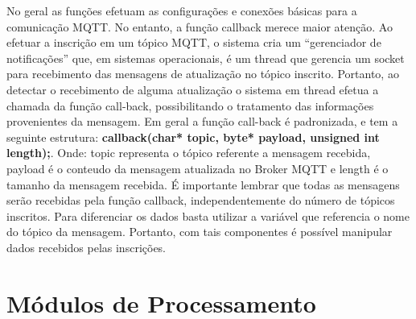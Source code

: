     No geral as funções efetuam as configurações e conexões básicas para a comunicação MQTT. No entanto, a função callback merece maior atenção.
	Ao efetuar a inscrição em um tópico MQTT, o sistema cria um “gerenciador de notificações” que, em sistemas operacionais, é um thread que gerencia um socket para recebimento das mensagens de atualização no tópico inscrito. Portanto, ao detectar o recebimento de alguma atualização o sistema em thread efetua a chamada da função call-back, possibilitando o tratamento das informações provenientes da mensagem.
	Em geral a função call-back é padronizada, e tem a seguinte estrutura: 
    \textbf{callback(char* topic, byte* payload, unsigned int length);}.
    Onde: topic representa o tópico referente a mensagem recebida, payload é o conteudo da mensagem atualizada no Broker MQTT e length é o tamanho da mensagem recebida.
	É importante lembrar que todas as mensagens serão recebidas pela função callback, independentemente do número de tópicos inscritos. Para diferenciar os dados basta utilizar a variável que referencia o nome do tópico da mensagem. Portanto, com tais componentes é possível manipular dados recebidos pelas inscrições.
    
\section{Módulos de Processamento}
